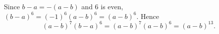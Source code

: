Since $b-a=-(a-b)$ and $6$ is even, $(b-a)^6=(-1)^6(a-b)^6=(a-b)^6$. Hence
\[
(a-b)^7(b-a)^6=(a-b)^7(a-b)^6=\boxed{(a-b)^{13}} .
\]
